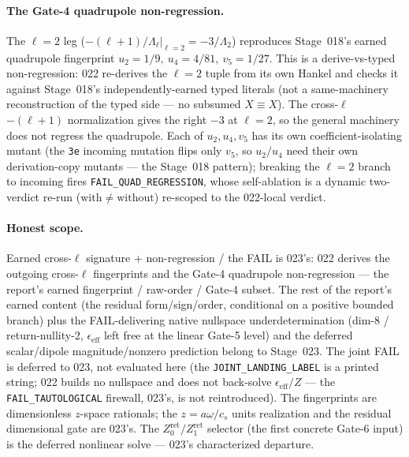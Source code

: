 \paragraph{The Gate-4 quadrupole non-regression.}
The \(\ell=2\) leg (\(-(\ell+1)/\Lambda_\ell|_{\ell=2}=-3/\Lambda_2\)) reproduces Stage~018's earned quadrupole fingerprint
\(u_2=1/9,\ u_4=4/81,\ v_5=1/27\). This is a derive-vs-typed non-regression: 022 re-derives the \(\ell=2\) tuple from its own
Hankel and checks it against Stage~018's independently-earned typed literals (not a same-machinery reconstruction of the typed
side --- no subsumed \(X\equiv X\)). The cross-\(\ell\) \(-(\ell+1)\) normalization gives the right \(-3\) at \(\ell=2\), so the
general machinery does not regress the quadrupole. Each of \(u_2,u_4,v_5\) has its own coefficient-isolating mutant (the
\texttt{3e} incoming mutation flips only \(v_5\), so \(u_2/u_4\) need their own derivation-copy mutants --- the Stage~018
pattern); breaking the \(\ell=2\) branch to incoming fires \texttt{FAIL\_QUAD\_REGRESSION}, whose self-ablation is a dynamic
two-verdict re-run (\(\mathrm{with}\neq\mathrm{without}\)) re-scoped to the 022-local verdict.

\paragraph{Honest scope.}
Earned cross-\(\ell\) signature + non-regression / the FAIL is 023's: 022 derives the outgoing cross-\(\ell\) fingerprints and
the Gate-4 quadrupole non-regression --- the report's earned fingerprint / raw-order / Gate-4 subset. The rest of the report's
earned content (the residual form/sign/order, conditional on a positive bounded branch) plus the FAIL-delivering native
nullspace underdetermination (dim-8 / return-nullity-2, \(\epsilon_{\mathrm{eff}}\) left free at the linear Gate-5 level) and
the deferred scalar/dipole magnitude/nonzero prediction belong to Stage~023. The joint FAIL is deferred to 023, not evaluated
here (the \texttt{JOINT\_LANDING\_LABEL} is a printed string; 022 builds no nullspace and does not back-solve
\(\epsilon_{\mathrm{eff}}/Z\) --- the \texttt{FAIL\_TAUTOLOGICAL} firewall, 023's, is not reintroduced). The fingerprints are
dimensionless \(z\)-space rationals; the \(z=a\omega/c_s\) units realization and the residual dimensional gate are 023's. The
\(Z_{0}^{\mathrm{ret}}/Z_{1}^{\mathrm{ret}}\) selector (the first concrete Gate-6 input) is the deferred nonlinear solve ---
023's characterized departure.

